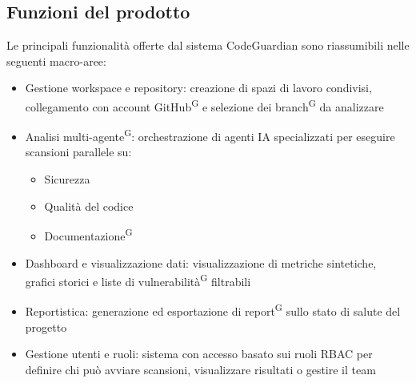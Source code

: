 \documentclass[a4paper, 11pt]{article}
\begin{document}
\subsection{Funzioni del prodotto}
Le principali funzionalità offerte dal sistema CodeGuardian sono riassumibili nelle seguenti macro-aree:
\begin{itemize}
    \item Gestione workspace e repository: creazione di spazi di lavoro condivisi, collegamento con account GitHub\textsuperscript{G} e selezione dei branch\textsuperscript{G} da analizzare
    \item Analisi multi-agente\textsuperscript{G}: orchestrazione di agenti IA specializzati per eseguire scansioni parallele su:
    \begin{itemize}
        \item Sicurezza
        \item Qualità del codice
        \item Documentazione\textsuperscript{G}
    \end{itemize}
    \item Dashboard e visualizzazione dati: visualizzazione di metriche sintetiche, grafici storici e liste di vulnerabilità\textsuperscript{G} filtrabili
    \item Reportistica: generazione ed esportazione di report\textsuperscript{G} sullo stato di salute del progetto
    \item Gestione utenti e ruoli: sistema con accesso basato sui ruoli RBAC per definire chi può avviare scansioni, visualizzare risultati o gestire il team
\end{itemize}
\end{document}
